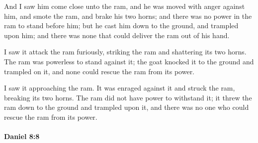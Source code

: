 			\begin{versebox}
					\item[BHS] 
					\item[LXX] 
					\item[ASV] And I saw him come close unto the ram, and he was moved with anger against him, and smote the ram, and brake his two horns; and there was no power in the ram to stand before him; but he cast him down to the ground, and trampled upon him; and there was none that could deliver the ram out of his hand.
					\item[NIV] I saw it attack the ram furiously, striking the ram and shattering its two horns. The ram was powerless to stand against it; the goat knocked it to the ground and trampled on it, and none could rescue the ram from its power.
					\item[NRSV] I saw it approaching the ram. It was enraged against it and struck the ram, breaking its two horns. The ram did not have power to withstand it; it threw the ram down to the ground and trampled upon it, and there was no one who could rescue the ram from its power.
			\end{versebox}

		\paragraph{Daniel 8:8} %
			\label{DANIEL-8-8}

